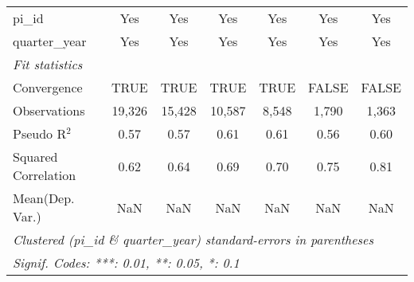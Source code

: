 \begin{tabular}{lcccccc}
   pi\_id                                                     & Yes           & Yes           & Yes           & Yes           & Yes           & Yes\\  
   quarter\_year                                              & Yes           & Yes           & Yes           & Yes           & Yes           & Yes\\  
   \midrule
   \emph{Fit statistics}\\
   Convergence                                                &TRUE           & TRUE          & TRUE          & TRUE          & FALSE         & FALSE\\  
   Observations                                               & 19,326        & 15,428        & 10,587        & 8,548         & 1,790         & 1,363\\  
   Pseudo R$^2$                                               & 0.57          & 0.57          & 0.61          & 0.61          & 0.56          & 0.60\\  
   Squared Correlation                                        & 0.62          & 0.64          & 0.69          & 0.70          & 0.75          & 0.81\\  
Mean(Dep. Var.) & NaN & NaN & NaN & NaN & NaN & NaN \\
   \midrule \midrule
   \multicolumn{7}{l}{\emph{Clustered (pi\_id \& quarter\_year) standard-errors in parentheses}}\\
   \multicolumn{7}{l}{\emph{Signif. Codes: ***: 0.01, **: 0.05, *: 0.1}}\\
\end{tabular}
\par\endgroup
